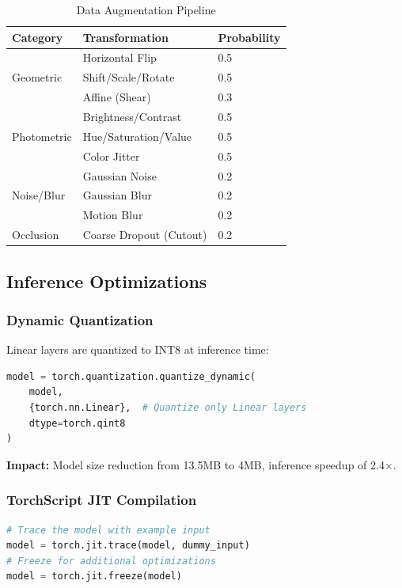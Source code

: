 \documentclass[12pt,a4paper]{article}
\begin{document}
\begin{table}[H]
\centering
\caption{Data Augmentation Pipeline}
\begin{tabular}{lll}
\toprule
\textbf{Category} & \textbf{Transformation} & \textbf{Probability} \\
\midrule
\multirow{3}{*}{Geometric} & Horizontal Flip & 0.5 \\
 & Shift/Scale/Rotate & 0.5 \\
 & Affine (Shear) & 0.3 \\
\midrule
\multirow{3}{*}{Photometric} & Brightness/Contrast & 0.5 \\
 & Hue/Saturation/Value & 0.5 \\
 & Color Jitter & 0.5 \\
\midrule
\multirow{3}{*}{Noise/Blur} & Gaussian Noise & 0.2 \\
 & Gaussian Blur & 0.2 \\
 & Motion Blur & 0.2 \\
\midrule
Occlusion & Coarse Dropout (Cutout) & 0.2 \\
\bottomrule
\end{tabular}
\end{table}

\subsection{Inference Optimizations}

\subsubsection{Dynamic Quantization}

Linear layers are quantized to INT8 at inference time:

\begin{lstlisting}[language=Python, caption=Dynamic Quantization]
model = torch.quantization.quantize_dynamic(
    model, 
    {torch.nn.Linear},  # Quantize only Linear layers
    dtype=torch.qint8
)
\end{lstlisting}

\textbf{Impact:} Model size reduction from 13.5MB to 4MB, inference speedup of 2.4×.

\subsubsection{TorchScript JIT Compilation}

\begin{lstlisting}[language=Python, caption=JIT Compilation]
# Trace the model with example input
model = torch.jit.trace(model, dummy_input)
# Freeze for additional optimizations
model = torch.jit.freeze(model)
\end{lstlisting}
\end{document}
